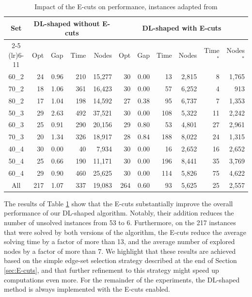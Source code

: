 \documentclass{article}
\newcommand{\tighttable}{%
  \setlength{\tabcolsep}{3pt}        %
  \renewcommand{\arraystretch}{1} %
}
\begin{document}
\renewcommand{\arraystretch}{1.0} 
\begin{table}[H]
\caption{Impact of the E-cuts on performance, instances adapted from \cite{jabali2014partial}} \label{Tab:Jabali_results}
\centering
    \small
    \tighttable
    \begin{tabular*}{\textwidth}{@{\extracolsep{\fill}}crrrrrrrrrr}
\toprule
\multicolumn{1}{c}{\multirow{2}{*}{Set }} & \multicolumn{4}{c}{\textbf{DL-shaped without E-cuts}} & \multicolumn{6}{c}{\textbf{DL-shaped with E-cuts}} \\ \cmidrule(lr){2-5} \cmidrule(lr){6-11} 
 & Opt & \hspace{0.2cm} Gap & \hspace{0.2cm} Time & Nodes & Opt & Gap & Time & Nodes &
 Time$^*$ & Nodes$^*$ \\ \hline
60\_2 & 24 & 0.96 & 210 & 15,277 & 30 & 0.00 & 13  & 2,815 & 8  & 1,765 \\
70\_2 & 18 & 1.06 & 361 & 16,423 & 30 & 0.00 & 57  & 6,252 & 4  & 913  \\
80\_2 & 17 & 1.04 & 198 & 14,592 & 27 & 0.38 & 95  & 6,737 & 7  & 1,353 \\
50\_3 & 29 & 2.63 & 492 & 37,521 & 30 & 0.00 & 108 & 5,322 & 11 & 2,242 \\
60\_3 & 25 & 0.91 & 290 & 20,156 & 29 & 0.80 & 53  & 4,801 & 27 & 2,961 \\
70\_3 & 20 & 1.34 & 326 & 18,917 & 28 & 0.84 & 188 & 8,022 & 24 & 1,315 \\
40\_4 & 30 & 0.00 &  40 &  7,934 & 30 & 0.00 & 16  & 2,652 & 16 & 2,652 \\
50\_4 & 25 & 0.66 & 190 & 11,171 & 30 & 0.00 & 196 & 8,441 & 35 & 3,769 \\
60\_4 & 29 & 0.90 & 460 & 25,625 & 30 & 0.00 & 114 & 5,826 & 75 & 4,622 \\ \hline
All & 217 & 1.07 & 337 & 19,083 & 264 & 0.60 & 93 & 5,625 & 25 & 2,557 \\ \hline
\end{tabular*}
\end{table}

The results of Table \ref{Tab:Jabali_results} show that the E-cuts substantially improve the overall performance of our DL-shaped algorithm. Notably, their addition reduces the number of unsolved instances from 53 to 6. Furthermore, on the 217 instances that were solved by both versions of the algorithm, the E-cuts reduce the average solving time by a factor of more than 13, and the average number of explored nodes by a factor of more than 7. We highlight that these results are achieved based on the simple edge-set selection strategy described at the end of Section \ref{sec:E-cuts}, and that further refinement to this strategy might speed up computations even more. For the remainder of the experiments, the DL-shaped method is always implemented with the E-cuts enabled. 
\end{document}
